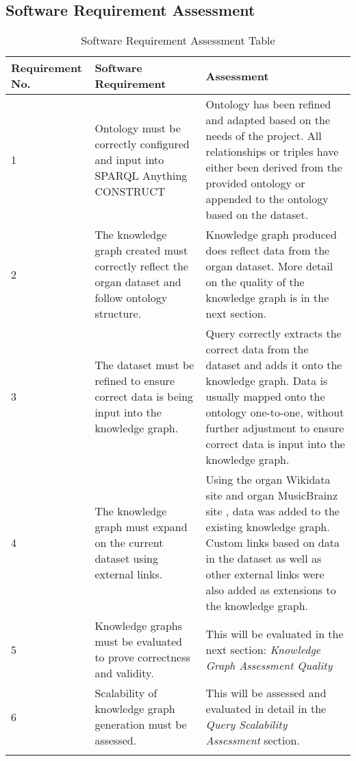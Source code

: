 \subsection{Software Requirement Assessment}
\begin{longtable}{|p{2.25cm}|p{5.5cm}|p{5.5cm}|}

\hline
\textbf{Requirement No.} & \textbf{Software Requirement} & \textbf{Assessment}\\
\hline

1& 
Ontology must be correctly configured and input into SPARQL Anything CONSTRUCT &
Ontology has been refined and adapted based on the needs of the project. All relationships or triples have either been derived from the provided ontology or appended to the ontology based on the dataset. \\
\hline

2&
The knowledge graph created must correctly reflect the organ dataset and follow ontology structure. &
Knowledge graph produced does reflect data from the organ dataset. More detail on the quality of the knowledge graph is in the next section. \\
\hline

3&
The dataset must be refined to ensure correct data is being input into the knowledge graph. &
Query correctly extracts the correct data from the dataset and adds it onto the knowledge graph. Data is usually mapped onto the ontology one-to-one, without further adjustment to ensure correct data is input into the knowledge graph. \\
\hline

4&
The knowledge graph must expand on the current dataset using external links. &
Using the organ Wikidata site \cite{organwikidata} and organ MusicBrainz site \cite{organmusicbrainz}, data was added to the existing knowledge graph. Custom links based on data in the dataset as well as other external links were also added as extensions to the knowledge graph. \\
\hline

5&
Knowledge graphs must be evaluated to prove correctness and validity. &
This will be evaluated in the next section: \textit{Knowledge Graph Assessment Quality} \\ 
\hline

6&
Scalability of knowledge graph generation must be assessed. &
This will be assessed and evaluated in detail in the \textit{Query Scalability Assessment} section. \\ 
\hline
\caption{Software Requirement Assessment Table}
\end{longtable}

